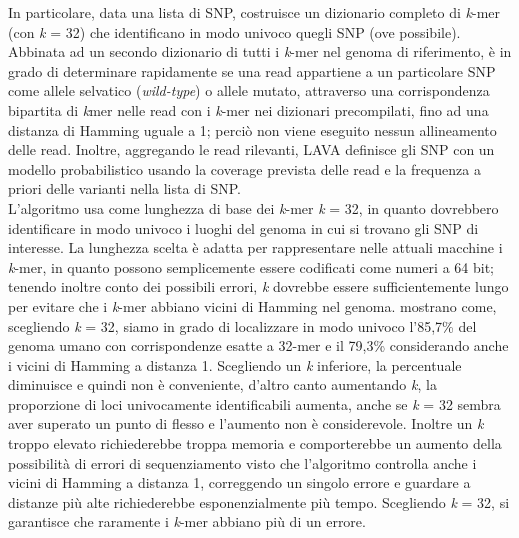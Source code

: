 \documentclass[../main.tex]{subfiles}
\begin{document}
In particolare, data una lista di SNP, costruisce un dizionario completo di \textit{k}-mer (con \textit{k} = 32) che identificano in modo univoco quegli SNP (ove possibile). Abbinata ad un secondo dizionario di tutti i \textit{k}-mer nel genoma di riferimento, è in grado di determinare rapidamente se una read appartiene a un particolare SNP come allele selvatico (\textit{wild-type}) o allele mutato, attraverso una corrispondenza bipartita di \textit{k}mer nelle read con i \textit{k}-mer nei dizionari precompilati, fino ad una distanza di Hamming uguale a 1; perciò non viene eseguito nessun allineamento delle read. Inoltre, aggregando le read rilevanti, LAVA definisce gli SNP con un modello probabilistico usando la coverage prevista delle read e la frequenza a priori delle varianti nella lista di SNP.\\

\noindent
L'algoritmo usa come lunghezza di base dei \textit{k}-mer \textit{k} = 32, in quanto dovrebbero identificare in modo univoco i luoghi del genoma in cui si trovano gli SNP di interesse. La lunghezza scelta è adatta per rappresentare nelle attuali macchine i \textit{k}-mer, in quanto possono semplicemente essere codificati come numeri a 64 bit; tenendo inoltre conto dei possibili errori, \textit{k} dovrebbe essere sufficientemente lungo per evitare che i \textit{k}-mer abbiano vicini di Hamming nel genoma. \cite{shajii2016lava} mostrano come, scegliendo \textit{k} = 32, siamo in grado di localizzare in modo univoco l'85,7\% del genoma umano con corrispondenze esatte a 32-mer e il 79,3\% considerando anche i vicini di Hamming a distanza 1. Scegliendo un \textit{k} inferiore, la percentuale diminuisce e quindi non è conveniente, d'altro canto aumentando \textit{k}, la proporzione di loci univocamente identificabili aumenta, anche se \textit{k} = 32 sembra aver superato un punto di flesso e l'aumento non è considerevole. Inoltre un \textit{k} troppo elevato richiederebbe troppa memoria e comporterebbe un aumento della possibilità di errori di sequenziamento visto che l'algoritmo controlla anche i vicini di Hamming a distanza 1, correggendo un singolo errore e guardare a distanze più alte richiederebbe esponenzialmente più tempo. Scegliendo \textit{k} = 32, si garantisce che raramente i \textit{k}-mer abbiano più di un errore.\\
\end{document}
